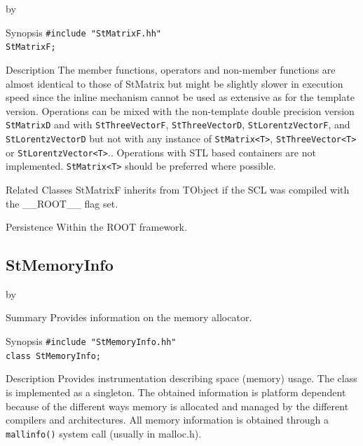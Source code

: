 \documentclass[twoside]{article}
\newcommand{\name}[1]{\textsf{#1}}%
\newcommand{\comp}[1]{\texttt{#1}}%
\newcommand{\entrylabel}[1]{\mbox{\textbf{{#1}}}\hfil}%
\newenvironment{entry}
{\begin{list}{}%
    {\renewcommand{\makelabel}{\entrylabel}%
     \setlength{\labelwidth}{90pt}%
     \setlength{\leftmargin}{\labelwidth}
     \advance\leftmargin by \labelsep%
      }%
    }%
  {\end{list}}
\newcommand{\Entrylabel}[1]%
{\raisebox{0pt}[1ex][0pt]{\makebox[\labelwidth][l]%
    {\parbox[t]{\labelwidth}{\hspace{0pt}\textbf{{#1}}}}}}
\newenvironment{Entry}%
{\renewcommand{\entrylabel}{\Entrylabel}\begin{entry}}%
  {\end{entry}}
\begin{document}
\begin{description}
\begin{Entry}
\item[Synopsis]
    \verb+#include "StMatrixF.hh"+ \\
    \verb+StMatrixF;+
    
    
\item[Description]       
    The member functions, operators and non-member functions are almost identical
    to those of StMatrix but might be slightly slower in execution speed
    since the inline mechanism cannot be used as extensive as for the template
    version. Operations can be mixed with the non-template double precision version
    \texttt{StMatrixD} and with \texttt{StThreeVectorF}, \texttt{StThreeVectorD},
    \texttt{StLorentzVectorF}, and \texttt{StLorentzVectorD}
    but not with any instance of \verb+StMatrix<T>+, \verb+StThreeVector<T>+ or
    \verb+StLorentzVector<T>+..
    Operations with STL based containers are not implemented.
    \verb+StMatrix<T>+ should be preferred where possible.
    
\item[Related Classes]
    StMatrixF inherits from TObject 
    if the SCL was compiled with the \name{\_\_ROOT\_\_} flag set.

\item[Persistence]
    Within the ROOT framework.

\end{Entry}

%
%
\subsection{StMemoryInfo}
\label{StMemoryInfo}
\begin{Entry}
\item[Summary]
    Provides information on the memory allocator.

\item[Synopsis]
    \verb+#include "StMemoryInfo.hh"+\\
    \verb+class StMemoryInfo;+
    
\item[Description]   
    Provides instrumentation describing space (memory) usage.
    The class is implemented as a singleton. The obtained information
    is platform dependent because of the different ways memory is
    allocated and managed by the different compilers and architectures.
    All memory information is obtained through a \comp{mallinfo()} system
    call (usually in malloc.h). 
    

\end{Entry}
\end{description}
\end{document}
